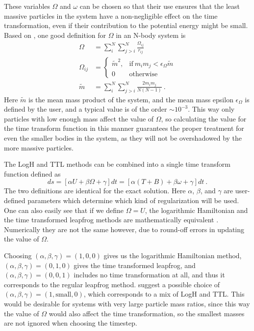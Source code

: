 \documentclass[english, oneside]{HYgradu}
\begin{document}
These variables $\Omega$ and $\omega$ can be chosen so that their use ensures that the least massive particles in the system have a non-negligible effect on the time transformation, even if their contribution to the potential energy might be small. Based on \cite{mikkola:2008b}, one good definition for $\Omega$ in an N-body system is 
\begin{equation}
\begin{aligned}
\Omega &= \sum_i^N \sum_{j>i}^N \frac{\Omega_{ij}}{r_{ij}} \\
\Omega_{ij} &=
\begin{cases}
\tilde{m}^2, &\mathrm{if} \ m_im_j < \epsilon_{\Omega} \tilde{m} \\
0  &\mathrm{otherwise}
\end{cases} \\
\tilde{m} &= \sum_i^N \sum_{j>i}^N \frac{2m_i m_j}{N(N-1)} \ .
\end{aligned}
\end{equation}
Here $\tilde{m}$ is the mean mass product of the system, and the mean mass epsilon $\epsilon_{\Omega}$ is defined by the user, and a typical value is of the order $\sim 10^{-3}$. This way only particles with low enough mass affect the value of $\Omega$, so calculating the value for the time transform function in this manner guarantees the proper treatment for even the smaller bodies in the system, as they will not be overshadowed by the more massive particles.

The LogH and TTL methods can be combined into a single time transform function defined as 
\begin{equation}
ds = [\alpha U + \beta \Omega + \gamma] dt = [\alpha (T + B) + \beta \omega + \gamma] dt \ .
\end{equation} \label{equ:regutimetransform}
The two definitions are identical for the exact solution. Here $\alpha$, $\beta$, and $\gamma$ are user-defined parameters which determine which kind of regularization will be used. One can also easily see that if we define $\Omega = U$, the logarithmic Hamiltonian and the time transformed leapfrog methods are mathematically equivalent \citep{mikkola:2008b}. Numerically they are not the same however, due to round-off errors in updating the value of $\Omega$. 

Choosing $(\alpha, \beta, \gamma) = (1,0,0)$ gives us the logarithmic Hamiltonian method, $(\alpha, \beta, \gamma) = (0,1,0)$ gives the time transformed leapfrog, and $(\alpha, \beta, \gamma) = (0,0,1)$ includes no time transformation at all, and thus it corresponds to the regular leapfrog method. \cite{mikkola:2006} suggest a possible choice of $(\alpha, \beta, \gamma) = (1,\mathrm{small},0)$, which corresponds to a mix of LogH and TTL. This would be desirable for systems with very large particle mass ratios, since this way the value of $\Omega$ would also affect the time transformation, so the smallest masses are not ignored when choosing the timestep. 
\end{document}
